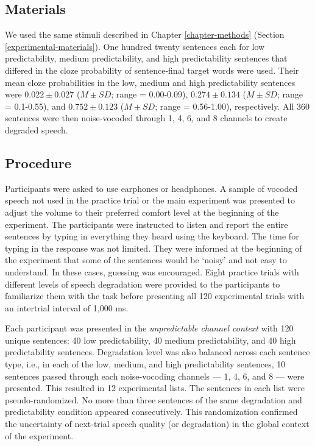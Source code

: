 \documentclass[a4paper, nobind]{templates/ociamthesis}
\begin{document}
\hypertarget{materials-1}{%
\subsection{Materials}\label{materials-1}}

We used the same stimuli described in Chapter \ref{chapter-methods} (Section \ref{experimental-materials}).
One hundred twenty sentences each for low predictability, medium predictability, and high predictability sentences that differed in the cloze probability of sentence-final target words were used.
Their mean cloze probabilities in the low, medium and high predictability sentences were \(0.022\pm0.027\) (\(M\pm SD\); range = 0.00-0.09), \(0.274\pm0.134\) (\(M\pm SD\); range = 0.1-0.55), and \(0.752\pm0.123\) (\(M\pm SD\); range = 0.56-1.00), respectively.
All 360 sentences were then noise-vocoded through 1, 4, 6, and 8 channels to create degraded speech.

\hypertarget{procedure-2}{%
\subsection{Procedure}\label{procedure-2}}

Participants were asked to use earphones or headphones.
A sample of vocoded speech not used in the practice trial or the main experiment was presented to adjust the volume to their preferred comfort level at the beginning of the experiment.
The participants were instructed to listen and report the entire sentences by typing in everything they heard using the keyboard.
The time for typing in the response was not limited.
They were informed at the beginning of the experiment that some of the sentences would be `noisy' and not easy to understand.
In these cases, guessing was encouraged.
Eight practice trials with different levels of speech degradation were provided to the participants to familiarize them with the task before presenting all 120 experimental trials with an intertrial interval of 1,000 ms.

Each participant was presented in the \emph{unpredictable channel context} with 120 unique sentences: 40 low predictability, 40 medium predictability, and 40 high predictability sentences.
Degradation level was also balanced across each sentence type, i.e., in each of the low, medium, and high predictability sentences, 10 sentences passed through each noise-vocoding channels --- 1, 4, 6, and 8 --- were presented.
This resulted in 12 experimental lists.
The sentences in each list were pseudo-randomized.
No more than three sentences of the same degradation and predictability condition appeared consecutively.
This randomization confirmed the uncertainty of next-trial speech quality (or degradation) in the global context of the experiment.
\end{document}
